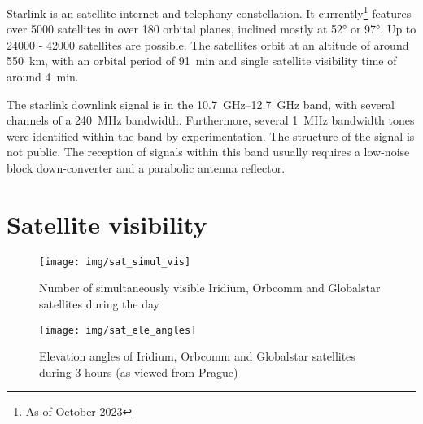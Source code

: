 Starlink is an satellite internet and telephony constellation. It currently\footnote{As of October 2023} features over \num{5000} satellites in over 180 orbital planes, inclined mostly at \ang{52} or \ang{97}. Up to 24000 - 42000 satellites are possible\cite{sop02}. The satellites orbit at an altitude of around \qty{550}{km}, with an orbital period of \qty{91}{min} and single satellite visibility time of around \qty{4}{min}.

The starlink downlink signal is in the \qtyrange{10.7}{12.7}{GHz} band, with several channels of a \qty{240}{MHz} bandwidth. Furthermore, several \qty{1}{MHz} bandwidth tones were identified within the band by experimentation. The structure of the signal is not public. The reception of signals within this band usually requires a low-noise block down-converter and a parabolic antenna reflector\cite{sop04}.

\section{Satellite visibility}
\begin{figure}
    \centering
    \texttt{[image: img/sat\_simul\_vis]}
    \caption{Number of simultaneously visible Iridium, Orbcomm and Globalstar satellites during the day}
    \label{f_sat_simul_vis}
\end{figure}

\begin{figure}
    \centering
    \texttt{[image: img/sat\_ele\_angles]}
    \caption{Elevation angles of Iridium, Orbcomm and Globalstar satellites during 3 hours (as viewed from Prague)}
    \label{f_sat_ele_angles}
\end{figure}